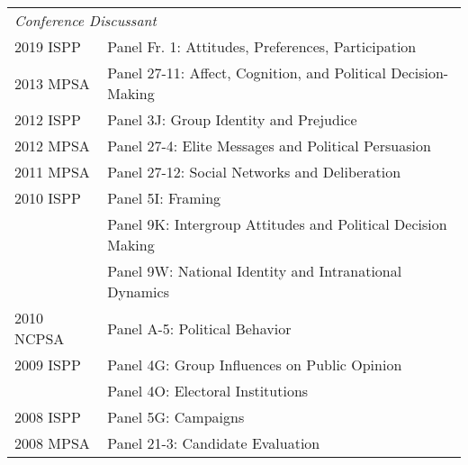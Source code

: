 \documentclass[12pt]{article}
\begin{document}
\begin{longtable}{@{}p{3.5cm}@{}l}%
    \multicolumn{2}{l}{\textit{Conference Discussant}}\\
			2019 ISPP & {Panel Fr. 1: Attitudes, Preferences, Participation}\\                    
            
            2013 MPSA & {Panel 27-11: Affect, 
            Cognition, and Political Decision-Making}\\
            
            2012 ISPP & {Panel 3J: Group Identity 
            and Prejudice}\\
            
            2012 MPSA & {Panel 27-4: Elite Messages 
            and Political Persuasion}\\
            
            2011 MPSA & {Panel 27-12: 
            Social Networks and Deliberation}\\
            
            2010 ISPP & {Panel 5I: Framing}\\
            
            & {Panel 9K: Intergroup Attitudes 
            and Political Decision Making}\\
            
            & {Panel 9W: National Identity 
            and Intranational Dynamics}\\
            
            2010 NCPSA & {Panel A-5: Political Behavior}\\
            
            2009 ISPP & {Panel 4G: Group Influences
             on Public Opinion}\\
             
            & {Panel 4O: Electoral Institutions}\\
            
            2008 ISPP & {Panel 5G: Campaigns}\\
            
            2008 MPSA & {Panel 21-3: Candidate Evaluation}\\
\end{longtable}
\end{document}

